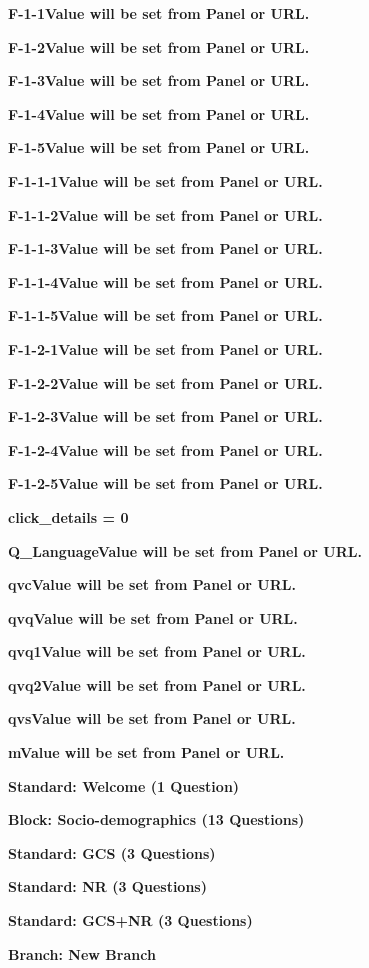 \documentclass{article} %
\begin{document}
\textbf{F-1-1Value will be set from Panel or URL.}

\textbf{F-1-2Value will be set from Panel or URL.}

\textbf{F-1-3Value will be set from Panel or URL.}

\textbf{F-1-4Value will be set from Panel or URL.}

\textbf{F-1-5Value will be set from Panel or URL.}

\textbf{F-1-1-1Value will be set from Panel or URL.}

\textbf{F-1-1-2Value will be set from Panel or URL.}

\textbf{F-1-1-3Value will be set from Panel or URL.}

\textbf{F-1-1-4Value will be set from Panel or URL.}

\textbf{F-1-1-5Value will be set from Panel or URL.}

\textbf{F-1-2-1Value will be set from Panel or URL.}

\textbf{F-1-2-2Value will be set from Panel or URL.}

\textbf{F-1-2-3Value will be set from Panel or URL.}

\textbf{F-1-2-4Value will be set from Panel or URL.}

\textbf{F-1-2-5Value will be set from Panel or URL.}

\textbf{click\_details = 0}

\textbf{Q\_LanguageValue will be set from Panel or URL.}

\textbf{qvcValue will be set from Panel or URL.}

\textbf{qvqValue will be set from Panel or URL.}

\textbf{qvq1Value will be set from Panel or URL.}

\textbf{qvq2Value will be set from Panel or URL.}

\textbf{qvsValue will be set from Panel or URL.}

\textbf{mValue will be set from Panel or URL.}

\noindent \textbf{Standard: Welcome (1 Question)}

\noindent \textbf{Block: Socio-demographics (13 Questions)}

\noindent \textbf{Standard: GCS (3 Questions)}

\noindent \textbf{Standard: NR (3 Questions)}

\noindent \textbf{Standard: GCS+NR (3 Questions)}

\noindent \textbf{Branch: New Branch}
\end{document}
